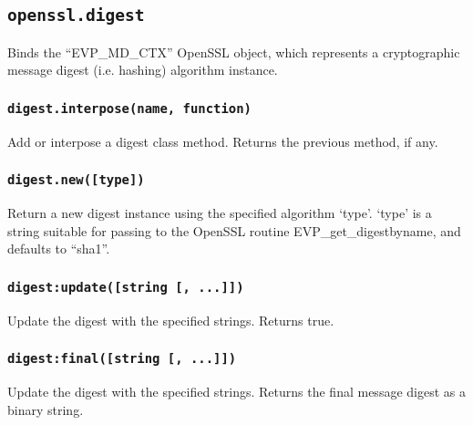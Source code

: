 \documentclass[11pt, oneside]{memoir}
\newcommand*{\fn}[1]{\texttt{#1}\xspace}
\newcounter{toccols}
\newenvironment{Module}[1]{
	\subsection{\texttt{#1}}
	\addtocontents{toc}{
		\protect\begin{multicols}{\value{toccols}}
	}
}{
	\addtocontents{toc}{\protect\end{multicols}}
}
\begin{document}
\begin{Module}{openssl.digest}

Binds the ``EVP\_MD\_CTX'' OpenSSL object, which represents a cryptographic message digest (i.e. hashing) algorithm instance.

\subsubsection[\fn{digest.interpose}]{\fn{digest.interpose(name, function)}}

Add or interpose a digest class method. Returns the previous method, if any.

\subsubsection[\fn{digest.new}]{\fn{digest.new([type])}}

Return a new digest instance using the specified algorithm `type'. `type' is a string suitable for passing to the OpenSSL routine EVP\_get\_digestbyname, and defaults to ``sha1''.

\subsubsection[\fn{digest:update}]{\fn{digest:update([string [, ...]])}}

Update the digest with the specified strings. Returns true.

\subsubsection[\fn{digest:final}]{\fn{digest:final([string [, ...]])}}

Update the digest with the specified strings. Returns the final message digest as a binary string.

\end{Module}
\end{document}
